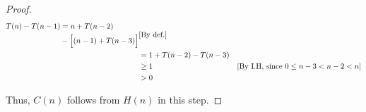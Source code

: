 \documentclass[12pt]{article}
\begin{document}
\begin{itemize}
\begin{mdframed}
\begin{proof}
        \begin{align}
        \begin{split}
        T(n) - T(n-1) &= n + T(n-2)\\
        &- \Bigl[(n-1) + T(n-3) \Bigr]
        \end{split} & [\text{By def.}]\\
        &= 1 + T(n-2) - T(n-3)\\
        &\geq 1 & [\text{By I.H, since $0 \leq n-3 < n-2 < n$}]\\
        &> 0
        \end{align}

        \bigskip

        Thus, $C(n)$ follows from $H(n)$ in this step.
    \end{proof}


    \end{mdframed}















\end{itemize}
\end{document}
